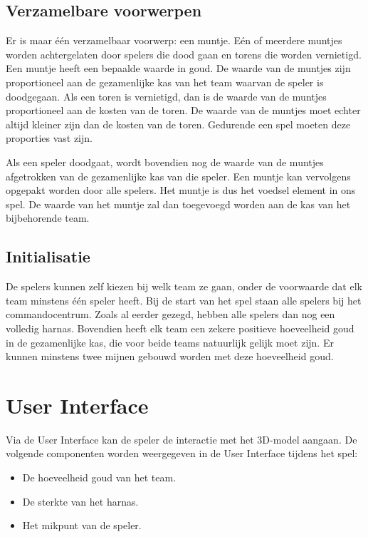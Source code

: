 \subsection{Verzamelbare voorwerpen}
Er is maar \'e\'en verzamelbaar voorwerp: een muntje. E\'en of meerdere muntjes worden achtergelaten door spelers die dood gaan en torens die worden vernietigd. Een muntje heeft een bepaalde waarde in goud. De waarde van de muntjes zijn proportioneel aan de gezamenlijke kas van het team waarvan de speler is doodgegaan. Als een toren is vernietigd, dan is de waarde van de muntjes proportioneel aan de kosten van de toren. De waarde van de muntjes moet echter altijd kleiner zijn dan de kosten van de toren. Gedurende een spel moeten deze proporties vast zijn.

Als een speler doodgaat, wordt bovendien nog de waarde van de muntjes afgetrokken van de gezamenlijke kas van die speler. Een muntje kan vervolgens opgepakt worden door alle spelers. Het muntje is dus het voedsel element in ons spel. De waarde van het muntje zal dan toegevoegd worden aan de kas van het bijbehorende team.

\subsection{Initialisatie}
De spelers kunnen zelf kiezen bij welk team ze gaan, onder de voorwaarde dat elk team minstens \'e\'en speler heeft. Bij de start van het spel staan alle spelers bij het commandocentrum. Zoals al eerder gezegd, hebben alle spelers dan nog een volledig harnas. Bovendien heeft elk team een zekere positieve hoeveelheid goud in de gezamenlijke kas, die voor beide teams natuurlijk gelijk moet zijn. Er kunnen minstens twee mijnen gebouwd worden met deze hoeveelheid goud.
\FloatBarrier
\section{User Interface}
\label{sec:UI}

Via de User Interface kan de speler de interactie met het 3D-model aangaan. De volgende componenten worden weergegeven in de User Interface tijdens het spel:
\begin{itemize}
\item De hoeveelheid goud van het team.
\item De sterkte van het harnas.
\item Het mikpunt van de speler. 
\end{itemize}

